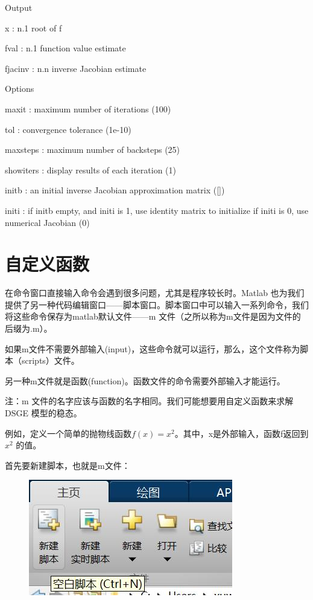 \documentclass[cn,10pt,math=newtx,citestyle=gb7714-2015,bibstyle=gb7714-2015]{elegantbook}
\begin{document}
{{	Output
	
	x         : n.1 root of f
	
	fval      : n.1 function value estimate
	
	fjacinv   : n.n inverse Jacobian estimate
	
	Options
	
	maxit     : maximum number of iterations (100)
	
	tol       : convergence tolerance (1e-10)
	
	maxsteps  : maximum number of backsteps (25)
	
	showiters : display results of each iteration (1)
	
	initb     : an initial inverse Jacobian approximation matrix ([])
	
	initi     : if initb empty, and initi is 1, use identity matrix to initialize if initi is 0, use numerical Jacobian (0)
	
	\section{自定义函数}
	
	在命令窗口直接输入命令会遇到很多问题，尤其是程序较长时。Matlab 也为我们提供了另一种代码编辑窗口——脚本窗口。脚本窗口中可以输入一系列命令，我们将这些命令保存为matlab默认文件——m 文件（之所以称为m文件是因为文件的后缀为.m）。
	
	如果m文件不需要外部输入(input)，这些命令就可以运行，那么，这个文件称为脚本（scripts）文件。
	
	另一种m文件就是函数(function)。函数文件的命令需要外部输入才能运行。
	
	注：m 文件的名字应该与函数的名字相同。我们可能想要用自定义函数来求解DSGE 模型的稳态。
	
	例如，定义一个简单的抛物线函数$f(x)=x^2$。其中，x是外部输入，函数f返回到$x^2$ 的值。
	
	首先要新建脚本，也就是m文件：
	\begin{figure}[htbp!]
		\centering
		\includegraphics[width=0.8\linewidth]{FIG/newscript}
		\centering
	\end{figure}
	
}}
\end{document}
